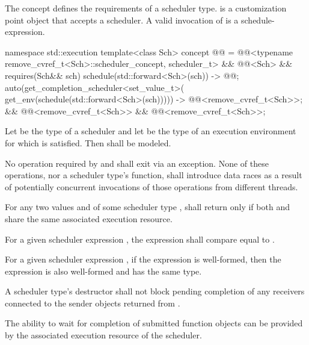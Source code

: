 \pnum
The  concept defines
the requirements of a scheduler type.
 is a customization point object
that accepts a scheduler.
A valid invocation of  is a schedule-expression.
\begin{codeblock}
namespace std::execution {
  template<class Sch>
    concept @@ =
      @@<typename remove_cvref_t<Sch>::scheduler_concept, scheduler_t> &&
      @@<Sch> &&
      requires(Sch&& sch) {
        { schedule(std::forward<Sch>(sch)) } -> @@;
        { auto(get_completion_scheduler<set_value_t>(
            get_env(schedule(std::forward<Sch>(sch))))) }
              -> @@<remove_cvref_t<Sch>>;
      } &&
      @@<remove_cvref_t<Sch>> &&
      @@<remove_cvref_t<Sch>>;
}
\end{codeblock}

\pnum
Let  be the type of a scheduler and
let  be the type of an execution environment
for which 
is satisfied.
Then 
shall be modeled.

\pnum
No operation required by
 and
shall exit via an exception.
None of these operations,
nor a scheduler type's  function,
shall introduce data races
as a result of potentially concurrent invocations
of those operations from different threads.

\pnum
For any two values  and 
of some scheduler type ,
 shall return 
only if both  and  share
the same associated execution resource.

\pnum
For a given scheduler expression ,
the expression
shall compare equal to .

\pnum
For a given scheduler expression ,
if the expression  is well-formed,
then the expression 
is also well-formed and has the same type.

\pnum
A scheduler type's destructor shall not block
pending completion of any receivers
connected to the sender objects returned from .
\begin{note}
The ability to wait for completion of submitted function objects
can be provided by the associated execution resource of the scheduler.
\end{note}

